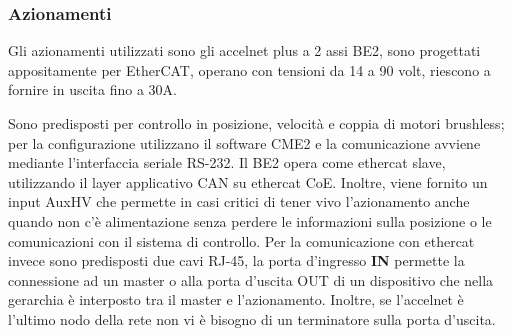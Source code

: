 \subsubsection{Azionamenti}
Gli azionamenti utilizzati sono gli accelnet plus a 2 assi BE2, sono progettati appositamente per EtherCAT, operano con tensioni da 14 a 90 volt, riescono a fornire in uscita fino a 30A.
\par Sono predisposti per controllo in posizione, velocità e coppia di motori brushless; per la configurazione utilizzano il software CME2 e la comunicazione avviene mediante l'interfaccia seriale RS-232. Il BE2 opera come ethercat slave, utilizzando il layer applicativo CAN su ethercat CoE. Inoltre, viene fornito un input AuxHV che permette in casi critici di tener vivo l'azionamento anche quando non c'è alimentazione senza perdere le informazioni sulla posizione o le comunicazioni con il sistema di controllo.
Per la comunicazione con ethercat invece sono predisposti due cavi RJ-45, la porta d'ingresso \textbf{IN} permette la connessione ad un master o alla porta d'uscita OUT di un dispositivo che nella gerarchia è interposto tra il master e l'azionamento. Inoltre, se l'accelnet è l'ultimo nodo della rete non vi è bisogno di un terminatore sulla porta d'uscita.
 
